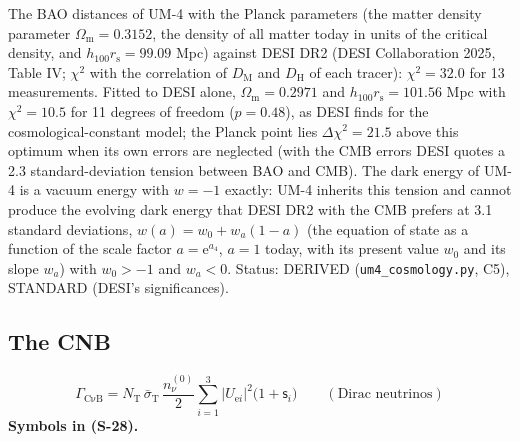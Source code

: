 \documentclass[
  10pt,
]{article}
\begin{document}
The BAO distances of UM-4 with the Planck parameters (the matter density
parameter \(\Omega_{\mathrm{m}} = 0.3152\), the density of all matter
today in units of the critical density, and
\(h_{100}r_{\mathrm{s}} = 99.09\) Mpc) against DESI DR2 (DESI
Collaboration 2025, Table IV; \(\chi^2\) with the correlation of
\(D_{\mathrm{M}}\) and \(D_{\mathrm{H}}\) of each tracer):
\(\chi^2 = 32.0\) for 13 measurements. Fitted to DESI alone,
\(\Omega_{\mathrm{m}} = 0.2971\) and \(h_{100}r_{\mathrm{s}} = 101.56\)
Mpc with \(\chi^2 = 10.5\) for 11 degrees of freedom (\(p = 0.48\)), as
DESI finds for the cosmological-constant model; the Planck point lies
\(\Delta\chi^2 = 21.5\) above this optimum when its own errors are
neglected (with the CMB errors DESI quotes a 2.3 standard-deviation
tension between BAO and CMB). The dark energy of UM-4 is a vacuum energy
with \(w = -1\) exactly: UM-4 inherits this tension and cannot produce
the evolving dark energy that DESI DR2 with the CMB prefers at 3.1
standard deviations, \(w(a) = w_0 + w_a(1 - a)\) (the equation of state
as a function of the scale factor \(a = \mathrm{e}^{a_4}\), \(a = 1\)
today, with its present value \(w_0\) and its slope \(w_a\)) with
\(w_0 > -1\) and \(w_a < 0\). Status: DERIVED
(\texttt{um4\_cosmology.py}, C5), STANDARD (DESI's significances).

\hypertarget{the-cnb}{%
\subsection{The CNB}\label{the-cnb}}

\[
\Gamma_{\mathrm{C\nu B}} = N_{\mathrm{T}}\,\bar\sigma_{\mathrm{T}}\,\frac{n_\nu^{(0)}}{2}\sum_{i=1}^{3}\lvert U_{\mathrm{e}i}\rvert^2\big(1 + \mathsf{s}_i\big)\qquad(\text{Dirac neutrinos}) \tag{S-28}
\] \textbf{Symbols in (S-28).}
\end{document}
